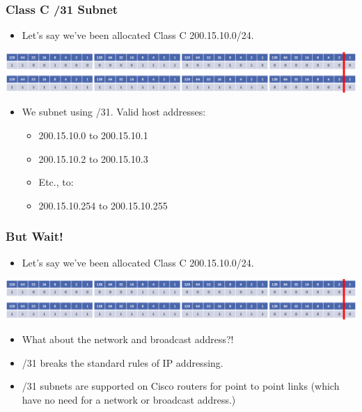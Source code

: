 \documentclass[pdflatex,compress]{beamer}
\begin{document}
\begin{frame}
	\frametitle{Class C /31 Subnet}
	\begin{itemize}
		\item Let's say we've been allocated Class C 200.15.10.0/24.
	\end{itemize}
	\begin{center}
		\includegraphics[width=1\linewidth]{img/img03}
	\end{center}
	\begin{itemize}
		\item We subnet using /31. Valid host addresses:
		\begin{itemize}
			\item 200.15.10.0 to 200.15.10.1
			\item 200.15.10.2 to 200.15.10.3
			\item Etc., to:
			\item 200.15.10.254 to 200.15.10.255
		\end{itemize}
	\end{itemize}
\end{frame}

\begin{frame}
	\frametitle{But Wait!}
	\begin{itemize}
		\item Let's say we've been allocated Class C 200.15.10.0/24.
	\end{itemize}
	\begin{center}
		\includegraphics[width=1\linewidth]{img/img03}
	\end{center}
	\begin{itemize}
		\item What about the network and broadcast address?!
		\item /31 breaks the standard rules of IP addressing.
		\item /31 subnets are supported on Cisco routers for point to point links (which have no need for a network or broadcast address.)
	\end{itemize}
\end{frame}
\end{document}
